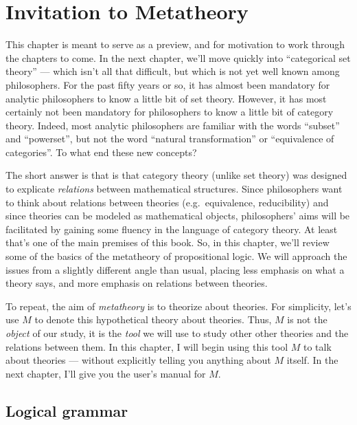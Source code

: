 \chapter{Invitation to Metatheory}

This chapter is meant to serve as a preview, and for motivation to
work through the chapters to come.  In the next chapter, we'll move
quickly into ``categorical set theory'' --- which isn't all that
difficult, but which is not yet well known among philosophers.  For
the past fifty years or so, it has almost been mandatory for analytic
philosophers to know a little bit of set theory.  However, it has most
certainly not been mandatory for philosophers to know a little bit of
category theory.  Indeed, most analytic philosophers are familiar with
the words ``subset'' and ``powerset'', but not the word ``natural
transformation'' or ``equivalence of categories''.  To what end these
new concepts?

The short answer is that is that category theory (unlike set theory)
was designed to explicate {\it relations} between mathematical
structures.  Since philosophers want to think about relations between
theories (e.g.\ equivalence, reducibility) and since theories can be
modeled as mathematical objects, philosophers' aims will be
facilitated by gaining some fluency in the language of category
theory.  At least that's one of the main premises of this book.  So,
in this chapter, we'll review some of the basics of the metatheory of
propositional logic.  We will approach the issues from a slightly
different angle than usual, placing less emphasis on what a theory
says, and more emphasis on relations between theories.

To repeat, the aim of \emph{metatheory} is to theorize about theories.
For simplicity, let's use $M$ to denote this hypothetical theory about
theories.  Thus, $M$ is not the {\it object} of our study, it is the
{\it tool} we will use to study other other theories and the relations
between them.  In this chapter, I will begin using this tool $M$ to
talk about theories --- without explicitly telling you anything about
$M$ itself.  In the next chapter, I'll give you the user's manual for
$M$.

\section{Logical grammar}

